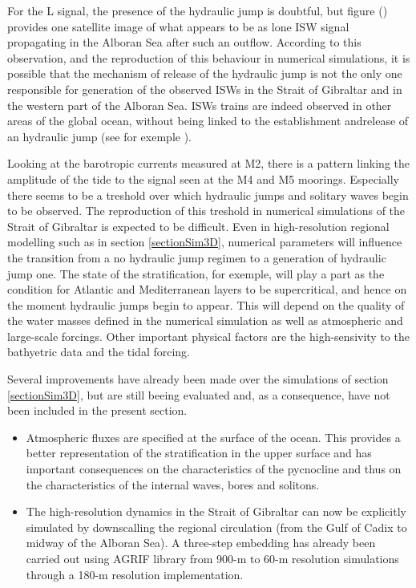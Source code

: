For the L signal, the presence of the hydraulic jump is doubtful, but figure () provides one satellite image of what appears to be as lone ISW signal propagating in the Alboran Sea after such an outflow. According to this observation, and the reproduction of this behaviour in numerical simulations, it is possible that the mechanism of release of the hydraulic jump is not the only one responsible for generation of the observed ISWs in the Strait of Gibraltar and in the western part of the Alboran Sea. ISWs trains are indeed observed in other areas of the global ocean, without being linked to the establishment andrelease of an hydraulic jump (see for exemple \citet{chen_2017}).

Looking at the barotropic currents measured at M2, there is a pattern linking the amplitude of the tide to the signal seen at the M4 and M5 moorings. Especially there seems to be a treshold over which hydraulic jumps and solitary waves begin to be observed. The reproduction of this treshold in numerical simulations of the Strait of Gibraltar is expected to be difficult. Even in high-resolution regional modelling such as in section \ref{sectionSim3D}, numerical parameters will influence the transition from a no hydraulic jump regimen to a generation of hydraulic jump one. The state of the stratification, for exemple, will play a part as the condition for Atlantic and Mediterranean layers to be supercritical, and hence on the moment hydraulic jumps begin to appear. This will depend on the quality of the water masses defined in the numerical simulation as well as atmospheric and large-scale forcings. Other important physical factors are the high-sensivity to the bathyetric data and the tidal forcing.

Several improvements have already been made over the simulations of section \ref{sectionSim3D}, but are still beeing evaluated and, as a consequence, have not been included in the present section. 
\begin{itemize}
\item Atmospheric fluxes are specified at the surface of the ocean.  This provides a better representation of the stratification in the upper surface and has important consequences on the characteristics of the pycnocline and thus on the characteristics of the internal waves, bores and solitons.
\item The high-resolution dynamics in the Strait of Gibraltar can now be explicitly simulated by downscalling the regional circulation (from the Gulf of Cadix to midway of the Alboran Sea). A three-step embedding has already been carried out using AGRIF library from 900-m to 60-m resolution simulations through a 180-m resolution implementation.
\end{itemize}
 


